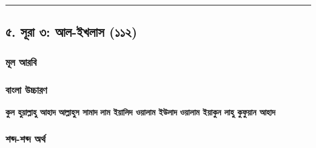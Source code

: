 \medskip\hrule\medskip

\subsection*{৫. সূরা ৩: আল-ইখলাস (১১২)}

\subsubsection*{মূল আরবি}
\begin{center}\end{center}
\begin{center}\end{center}
\begin{center}\end{center}
\begin{center}\end{center}

\subsubsection*{বাংলা উচ্চারণ}
\textbf{কুল হুয়াল্লাহু আহাদ}
\textbf{আল্লাহুস সামাদ}
\textbf{লাম ইয়ালিদ ওয়ালাম ইউলাদ}
\textbf{ওয়ালাম ইয়াকুন লাহু কুফুয়ান আহাদ}

\subsubsection*{শব্দ-শব্দ অর্থ}

